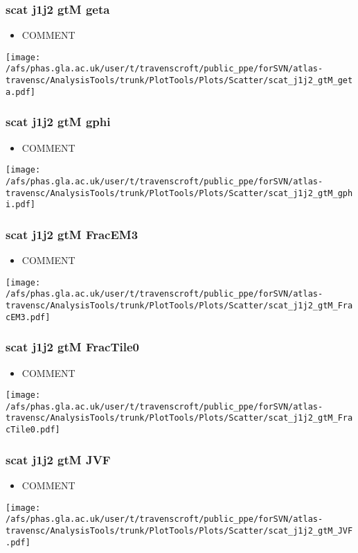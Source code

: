 \documentclass{beamer}
\begin{document}
\begin{frame}
\frametitle{scat j1j2 gtM geta}
\begin{itemize}
\item COMMENT
\end{itemize}
\begin{center}
\texttt{[image: /afs/phas.gla.ac.uk/user/t/travenscroft/public\_ppe/forSVN/atlas-travensc/AnalysisTools/trunk/PlotTools/Plots/Scatter/scat\_j1j2\_gtM\_geta.pdf]}
\end{center}
\end{frame}

\begin{frame}
\frametitle{scat j1j2 gtM gphi}
\begin{itemize}
\item COMMENT
\end{itemize}
\begin{center}
\texttt{[image: /afs/phas.gla.ac.uk/user/t/travenscroft/public\_ppe/forSVN/atlas-travensc/AnalysisTools/trunk/PlotTools/Plots/Scatter/scat\_j1j2\_gtM\_gphi.pdf]}
\end{center}
\end{frame}

\begin{frame}
\frametitle{scat j1j2 gtM FracEM3}
\begin{itemize}
\item COMMENT
\end{itemize}
\begin{center}
\texttt{[image: /afs/phas.gla.ac.uk/user/t/travenscroft/public\_ppe/forSVN/atlas-travensc/AnalysisTools/trunk/PlotTools/Plots/Scatter/scat\_j1j2\_gtM\_FracEM3.pdf]}
\end{center}
\end{frame}

\begin{frame}
\frametitle{scat j1j2 gtM FracTile0}
\begin{itemize}
\item COMMENT
\end{itemize}
\begin{center}
\texttt{[image: /afs/phas.gla.ac.uk/user/t/travenscroft/public\_ppe/forSVN/atlas-travensc/AnalysisTools/trunk/PlotTools/Plots/Scatter/scat\_j1j2\_gtM\_FracTile0.pdf]}
\end{center}
\end{frame}

\begin{frame}
\frametitle{scat j1j2 gtM JVF}
\begin{itemize}
\item COMMENT
\end{itemize}
\begin{center}
\texttt{[image: /afs/phas.gla.ac.uk/user/t/travenscroft/public\_ppe/forSVN/atlas-travensc/AnalysisTools/trunk/PlotTools/Plots/Scatter/scat\_j1j2\_gtM\_JVF.pdf]}
\end{center}
\end{frame}
\end{document}
